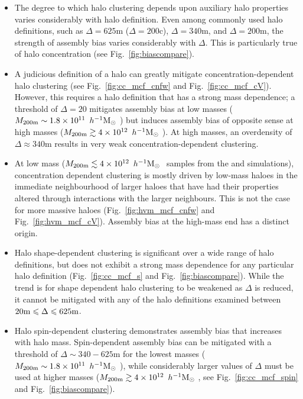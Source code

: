 \documentclass[usenatbib,fleqn]{mnras}
\begin{document}
\begin{itemize}
\baselineskip

    \item The degree to which halo clustering depends upon auxiliary halo properties varies considerably with halo definition. Even among commonly used halo definitions, such as $\Delta=625$m ($\Delta=200$c), $\Delta=340$m, and $\Delta=200$m, the strength of assembly bias varies considerably with $\Delta$. This is particularly true of halo concentration (see Fig.~\ref{fig:biascompare}). 
    
    \item A judicious definition of a halo can greatly mitigate concentration-dependent halo clustering (see Fig.~\ref{fig:cc_mcf_cnfw} and Fig.~\ref{fig:cc_mcf_cV}). However, this requires a halo definition that has a strong mass dependence; a threshold of $\Delta=20$ mitigates assembly bias at low masses 
($M_{200\text{m}} \sim 1.8 \times 10^{11}\, \hMsun$) but induces assembly bias of opposite sense at high masses ($M_{200\text{m}} \gtrsim 4 \times 10^{12}\, \hMsun$). 
At high masses, an overdensity of $\Delta \approx 340$m results in 
very weak concentration-dependent clustering.

	\item At low mass ($M_{200{\rm m}} \lesssim 4 \times 10^{12}\, \hMsun$ samples from the \simA{} and \simB{} simulations), concentration dependent clustering is mostly driven by low-mass haloes in the immediate neighbourhood of larger haloes that have had their properties altered through interactions with the larger neighbours. This is not the case for more massive haloes (Fig.~\ref{fig:hvm_mcf_cnfw} and Fig.~\ref{fig:hvm_mcf_cV}). Assembly bias at the high-mass end has a distinct origin.
    
    \item Halo shape-dependent clustering is significant over a wide range of halo definitions, but does not exhibit a strong mass dependence for any particular halo definition (Fig.~\ref{fig:cc_mcf_s} and Fig.~\ref{fig:biascompare}). While the trend is for shape dependent halo clustering to be weakened as $\Delta$ is reduced, it cannot be mitigated with any of the halo definitions examined between $20{\rm m} \leq \Delta \leq 625{\rm m}$.
    
    \item Halo spin-dependent clustering demonstrates assembly bias that increases with halo mass. Spin-dependent assembly bias can be mitigated with a threshold of $\Delta \sim 340-625$m for the lowest masses ($M_{200\text{m}} \sim 1.8 \times10^{11}\, \hMsun$), while considerably larger values of $\Delta$ must be used at higher masses ($M_{200\text{m}} \gtrsim 4 \times 10^{12}\, \hMsun$, see Fig.~\ref{fig:cc_mcf_spin} and Fig.~\ref{fig:biascompare}).
    

\end{itemize}
\end{document}
